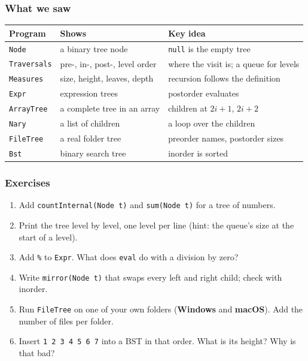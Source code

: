 \documentclass[aspectratio=169,10pt,compress]{beamer}
\newcommand{\win}{\textbf{Windows}}
\newcommand{\mac}{\textbf{macOS}}
\begin{document}




\begin{frame}[t,fragile] \frametitle{What we saw}
  \begin{center}\small
  \begin{tabular}{lL{0.3\textwidth}L{0.36\textwidth}}
    \toprule
    \textbf{Program}   & \textbf{Shows}                         & \textbf{Key idea} \\
    \midrule
    \texttt{Node}      & a binary tree node                     & \texttt{null} is the empty tree \\
    \texttt{Traversals}& pre-, in-, post-, level order          & where the visit is; a queue for levels \\
    \texttt{Measures}  & size, height, leaves, depth            & recursion follows the definition \\
    \texttt{Expr}      & expression trees                       & postorder evaluates \\
    \texttt{ArrayTree} & a complete tree in an array            & children at $2i + 1$, $2i + 2$ \\
    \texttt{Nary}      & a list of children                     & a loop over the children \\
    \texttt{FileTree}  & a real folder tree                     & preorder names, postorder sizes \\
    \texttt{Bst}       & binary search tree                     & inorder is sorted \\
    \bottomrule
  \end{tabular}
  \end{center}
\end{frame}




\begin{frame}[t,fragile] \frametitle{Exercises}
  \begin{enumerate}\small
    \item Add \texttt{countInternal(Node t)} and \texttt{sum(Node t)} for a tree of numbers.
    \item Print the tree level by level, one level per line (hint: the queue's size at the start of a level).
    \item Add \texttt{\%} to \texttt{Expr}. What does \texttt{eval} do with a division by zero?
    \item Write \texttt{mirror(Node t)} that swaps every left and right child; check with inorder.
    \item Run \texttt{FileTree} on one of your own folders (\win{} and \mac). Add the number of files per folder.
    \item Insert \texttt{1 2 3 4 5 6 7} into a BST in that order. What is its height? Why is that bad?
  \end{enumerate}
\end{frame}
\end{document}
